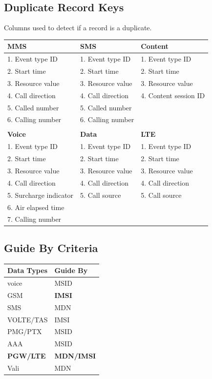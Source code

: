\documentclass[12pt,twoside]{article}
\begin{document}
\subsection{Duplicate Record Keys}
\label{sec:orgheadline22}
Columns used to detect if a record is a duplicate.
\small
\begin{center}
\begin{tabular}{lll}
\hline
\textbf{MMS} & \textbf{SMS} & \textbf{Content}\\
\hline
1. Event type ID & 1. Event type ID & 1. Event type ID\\
2. Start time & 2. Start time & 2. Start time\\
3. Resource value & 3. Resource value & 3. Resource value\\
4. Call direction & 4. Call direction & 4. Content session ID\\
5. Called number & 5. Called number & \\
6. Calling number & 6. Calling number & \\
 &  & \\
\hline
\textbf{Voice} & \textbf{Data} & \textbf{LTE}\\
\hline
1. Event type ID & 1. Event type ID & 1. Event type ID\\
2. Start time & 2. Start time & 2. Start time\\
3. Resource value & 3. Resource value & 3. Resource value\\
4. Call direction & 4. Call direction & 4. Call direction\\
5. Surcharge indicator & 5. Call source & 5. Call source\\
6. Air elapsed time &  & \\
7. Calling number &  & \\
\hline
\end{tabular}
\end{center}

\normalsize
\subsection{Guide By Criteria}
\label{sec:orgheadline23}

\begin{center}
\begin{tabular}{ll}
\hline
\textbf{Data Types} & \textbf{Guide By}\\
\hline
voice & MSID\\
GSM & \textbf{IMSI}\\
SMS & MDN\\
VOLTE/TAS & IMSI\\
PMG/PTX & MSID\\
AAA & MSID\\
\textbf{PGW/LTE} & \textbf{MDN/IMSI}\\
Vali & MDN\\
\hline
\end{tabular}
\end{center}
\end{document}

